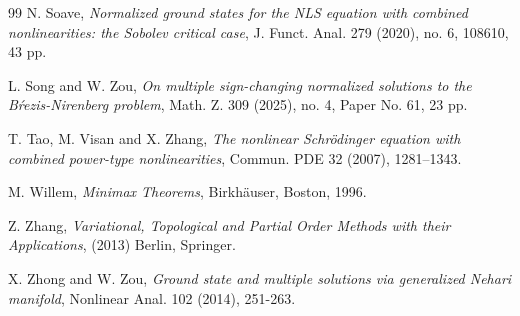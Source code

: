 \documentclass[11pt]{amsart}
\numberwithin{equation}{section}
\begin{document}
\begin{thebibliography}{99}
 N. Soave, {\it Normalized ground states for the NLS equation with combined nonlinearities: the Sobolev critical case}, J. Funct. Anal.
279 (2020), no. 6, 108610, 43 pp.

 L. Song and W. Zou, {\it On multiple sign-changing normalized solutions to the B\'rezis-Nirenberg problem}, Math. Z. 309 (2025), no. 4, Paper No. 61, 23 pp.

T. Tao, M. Visan and X. Zhang, {\it The nonlinear Schr\"{o}dinger equation with combined power-type nonlinearities},
Commun. PDE 32 (2007), 1281--1343.

  M. Willem, {\it Minimax Theorems}, Birkh\"{a}user, Boston, 1996.

 Z. Zhang, {\it Variational, Topological and Partial Order Methods with their Applications}, (2013) Berlin, Springer.

X. Zhong and W. Zou, {\it Ground state and multiple solutions via generalized Nehari manifold}, Nonlinear Anal. 102 (2014), 251-263.

  \end{thebibliography}
  
\end{document}
